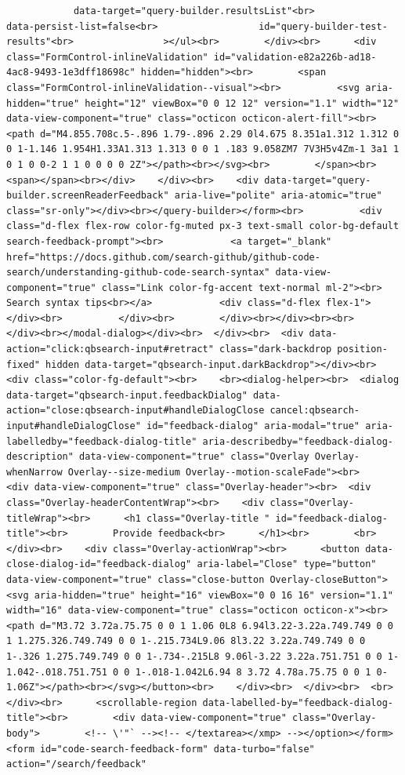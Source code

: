 \documentclass[
  letterpaper,
]{book}
\begin{document}
\begin{verbatim}
            data-target="query-builder.resultsList"<br>                  data-persist-list=false<br>                  id="query-builder-test-results"<br>                ></ul><br>        </div><br>      <div class="FormControl-inlineValidation" id="validation-e82a226b-ad18-4ac8-9493-1e3dff18698c" hidden="hidden"><br>        <span class="FormControl-inlineValidation--visual"><br>          <svg aria-hidden="true" height="12" viewBox="0 0 12 12" version="1.1" width="12" data-view-component="true" class="octicon octicon-alert-fill"><br>    <path d="M4.855.708c.5-.896 1.79-.896 2.29 0l4.675 8.351a1.312 1.312 0 0 1-1.146 1.954H1.33A1.313 1.313 0 0 1 .183 9.058ZM7 7V3H5v4Zm-1 3a1 1 0 1 0 0-2 1 1 0 0 0 0 2Z"></path><br></svg><br>        </span><br>        <span></span><br></div>    </div><br>    <div data-target="query-builder.screenReaderFeedback" aria-live="polite" aria-atomic="true" class="sr-only"></div><br></query-builder></form><br>          <div class="d-flex flex-row color-fg-muted px-3 text-small color-bg-default search-feedback-prompt"><br>            <a target="_blank" href="https://docs.github.com/search-github/github-code-search/understanding-github-code-search-syntax" data-view-component="true" class="Link color-fg-accent text-normal ml-2"><br>              Search syntax tips<br></a>            <div class="d-flex flex-1"></div><br>          </div><br>        </div><br></div><br><br>    </div><br></modal-dialog></div><br>  </div><br>  <div data-action="click:qbsearch-input#retract" class="dark-backdrop position-fixed" hidden data-target="qbsearch-input.darkBackdrop"></div><br>  <div class="color-fg-default"><br>    <br><dialog-helper><br>  <dialog data-target="qbsearch-input.feedbackDialog" data-action="close:qbsearch-input#handleDialogClose cancel:qbsearch-input#handleDialogClose" id="feedback-dialog" aria-modal="true" aria-labelledby="feedback-dialog-title" aria-describedby="feedback-dialog-description" data-view-component="true" class="Overlay Overlay-whenNarrow Overlay--size-medium Overlay--motion-scaleFade"><br>    <div data-view-component="true" class="Overlay-header"><br>  <div class="Overlay-headerContentWrap"><br>    <div class="Overlay-titleWrap"><br>      <h1 class="Overlay-title " id="feedback-dialog-title"><br>        Provide feedback<br>      </h1><br>        <br>    </div><br>    <div class="Overlay-actionWrap"><br>      <button data-close-dialog-id="feedback-dialog" aria-label="Close" type="button" data-view-component="true" class="close-button Overlay-closeButton"><svg aria-hidden="true" height="16" viewBox="0 0 16 16" version="1.1" width="16" data-view-component="true" class="octicon octicon-x"><br>    <path d="M3.72 3.72a.75.75 0 0 1 1.06 0L8 6.94l3.22-3.22a.749.749 0 0 1 1.275.326.749.749 0 0 1-.215.734L9.06 8l3.22 3.22a.749.749 0 0 1-.326 1.275.749.749 0 0 1-.734-.215L8 9.06l-3.22 3.22a.751.751 0 0 1-1.042-.018.751.751 0 0 1-.018-1.042L6.94 8 3.72 4.78a.75.75 0 0 1 0-1.06Z"></path><br></svg></button><br>    </div><br>  </div><br>  <br></div><br>      <scrollable-region data-labelled-by="feedback-dialog-title"><br>        <div data-view-component="true" class="Overlay-body">        <!-- \'"` --><!-- </textarea></xmp> --></option></form><form id="code-search-feedback-form" data-turbo="false" action="/search/feedback" 
\end{verbatim}
\end{document}
